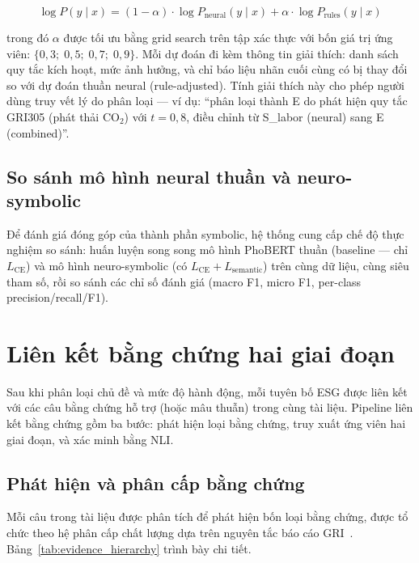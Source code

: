 \begin{equation}
    \log P(y \mid x) = (1 - \alpha) \cdot \log P_{\text{neural}}(y \mid x) + \alpha \cdot \log P_{\text{rules}}(y \mid x)
\end{equation}

\noindent trong đó $\alpha$ được tối ưu bằng grid search trên tập xác thực với bốn giá trị ứng viên: $\{0{,}3;\; 0{,}5;\; 0{,}7;\; 0{,}9\}$. Mỗi dự đoán đi kèm thông tin giải thích: danh sách quy tắc kích hoạt, mức ảnh hưởng, và chỉ báo liệu nhãn cuối cùng có bị thay đổi so với dự đoán thuần neural (rule-adjusted). Tính giải thích này cho phép người dùng truy vết lý do phân loại --- ví dụ: ``phân loại thành E do phát hiện quy tắc GRI305 (phát thải CO$_2$) với $t = 0{,}8$, điều chỉnh từ S\_labor (neural) sang E (combined)''.


\subsection{So sánh mô hình neural thuần và neuro-symbolic}
\label{subsec:experiment_comparison}

Để đánh giá đóng góp của thành phần symbolic, hệ thống cung cấp chế độ thực nghiệm so sánh: huấn luyện song song mô hình PhoBERT thuần (baseline --- chỉ $L_{\text{CE}}$) và mô hình neuro-symbolic (có $L_{\text{CE}} + L_{\text{semantic}}$) trên cùng dữ liệu, cùng siêu tham số, rồi so sánh các chỉ số đánh giá (macro F1, micro F1, per-class precision/recall/F1).


\section{Liên kết bằng chứng hai giai đoạn}
\label{sec:evidence_linking}

Sau khi phân loại chủ đề và mức độ hành động, mỗi tuyên bố ESG được liên kết với các câu bằng chứng hỗ trợ (hoặc mâu thuẫn) trong cùng tài liệu. Pipeline liên kết bằng chứng gồm ba bước: phát hiện loại bằng chứng, truy xuất ứng viên hai giai đoạn, và xác minh bằng NLI.


\subsection{Phát hiện và phân cấp bằng chứng}
\label{subsec:evidence_detection}

Mỗi câu trong tài liệu được phân tích để phát hiện bốn loại bằng chứng, được tổ chức theo hệ phân cấp chất lượng dựa trên nguyên tắc báo cáo GRI~\cite{gri2021gri}. Bảng~\ref{tab:evidence_hierarchy} trình bày chi tiết.

